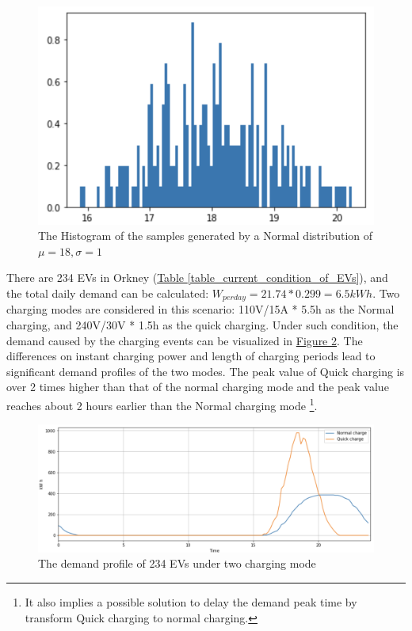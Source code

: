 \documentclass[12pt,a4paper]{report}
\begin{document}
                \begin{figure}[ht]
                    \centerline{\includegraphics[scale=1.3]{normalHistogram}}
                    \caption{The Histogram of the samples generated by a Normal distribution of $\mu = 18, \sigma = 1$}
                    \label{fig_normal_histogram}
                \end{figure}

                There are 234 EVs in Orkney (\hyperref[table_current_condition_of_EVs]{Table \ref*{table_current_condition_of_EVs}}), and the total daily demand can be calculated: $ W_{perday} = 21.74 * 0.299 = 6.5 kW h$. Two charging modes are considered in this scenario: 110V/15A * 5.5h as the Normal charging, and 240V/30V * 1.5h as the quick charging.
                Under such condition, the demand caused by the charging events can be visualized in \hyperref[fig_charging_demand_234]{Figure \ref*{fig_charging_demand_234}}. The differences on instant charging power and length of charging periods lead to significant demand profiles of the two modes. The peak value of Quick charging is over 2 times higher than that of the normal charging mode and the peak value reaches about 2 hours earlier than the Normal charging mode \footnote{It also implies a possible solution to delay the demand peak time by transform Quick charging to normal charging.}.

                \begin{figure}[ht]
                    \centerline{\includegraphics[scale=1]{chargiingEventsOriginPenetration}}
                    \caption{The demand profile of 234 EVs under two charging mode}
                    \label{fig_charging_demand_234}
                \end{figure}
\end{document}
